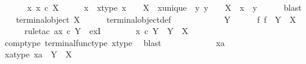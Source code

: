 \begin{isabellebody}
\ \ \isamarkupfalse%
\isanewline
{}\isamarkupfalse%
\isanewline
\ \ \isamarkupfalse%
\ {\isachardoublequoteopen}{\isasymexists}{\isacharbang}{\kern0pt}x{\isachardot}{\kern0pt}\ x\ {\isasymin}\isactrlsub c\ X{\isachardoublequoteclose}\isanewline
\ \ \isamarkupfalse%
\ \isamarkupfalse%
\ x\ \ x{\isacharunderscore}{\kern0pt}type{\isacharcolon}{\kern0pt}\ {\isachardoublequoteopen}x\ {\isacharcolon}{\kern0pt}\ {\isasymone}\ {\isasymrightarrow}\ X{\isachardoublequoteclose}\ \ x{\isacharunderscore}{\kern0pt}unique{\isacharcolon}{\kern0pt}\ {\isachardoublequoteopen}{\isasymforall}\ y{\isachardot}{\kern0pt}\ y\ {\isacharcolon}{\kern0pt}\ {\isasymone}\ {\isasymrightarrow}\ X\ {\isasymlongrightarrow}\ x\ {\isacharequal}{\kern0pt}\ y{\isachardoublequoteclose}\isanewline
\ \ \ \ \isamarkupfalse%
\ blast\isanewline
\ \ \isamarkupfalse%
\ {\isachardoublequoteopen}terminal{\isacharunderscore}{\kern0pt}object\ X{\isachardoublequoteclose}\isanewline
\ \ \ \ \isamarkupfalse%
\ terminal{\isacharunderscore}{\kern0pt}object{\isacharunderscore}{\kern0pt}def\ \ \isanewline
\ \ \isamarkupfalse%
\ \isanewline
\ \ \ \ \isamarkupfalse%
\ Y\isanewline
\ \ \ \ \isamarkupfalse%
\ {\isachardoublequoteopen}{\isasymexists}{\isacharbang}{\kern0pt}f{\isachardot}{\kern0pt}\ f\ {\isacharcolon}{\kern0pt}\ Y\ {\isasymrightarrow}\ X{\isachardoublequoteclose}\isanewline
\ \ \ \ \isamarkupfalse%
\ {\isacharparenleft}{\kern0pt}rule{\isacharunderscore}{\kern0pt}tac\ a{\isacharequal}{\kern0pt}{\isachardoublequoteopen}x\ {\isasymcirc}\isactrlsub c\ {\isasymbeta}\isactrlbsub Y\isactrlesub {\isachardoublequoteclose}\ \ ex{}I{\isacharparenright}{\kern0pt}\isanewline
\ \ \ \ \ \ \isamarkupfalse%
\ {\isachardoublequoteopen}x\ {\isasymcirc}\isactrlsub c\ {\isasymbeta}\isactrlbsub Y\isactrlesub \ {\isacharcolon}{\kern0pt}\ Y\ {\isasymrightarrow}\ X{\isachardoublequoteclose}\isanewline
\ \ \ \ \ \ \ \ \isamarkupfalse%
\ comp{\isacharunderscore}{\kern0pt}type\ terminal{\isacharunderscore}{\kern0pt}func{\isacharunderscore}{\kern0pt}type\ x{\isacharunderscore}{\kern0pt}type\ \isamarkupfalse%
\ blast\isanewline
\ \ \ \ \isamarkupfalse%
\isanewline
\ \ \ \ \ \ \isamarkupfalse%
\ xa\isanewline
\ \ \ \ \ \ \isamarkupfalse%
\ xa{\isacharunderscore}{\kern0pt}type{\isacharcolon}{\kern0pt}\ {\isachardoublequoteopen}xa\ {\isacharcolon}{\kern0pt}\ Y\ {\isasymrightarrow}\ X{\isachardoublequoteclose}\isanewline

\end{isabellebody}
